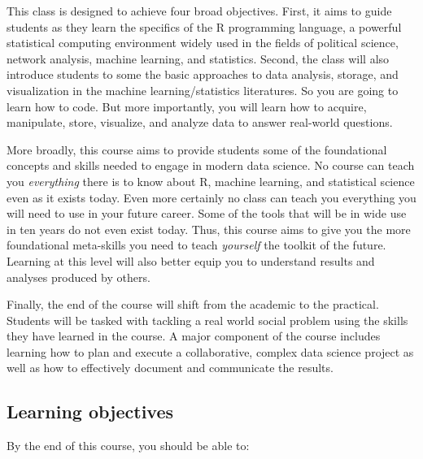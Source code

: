 \documentclass[11pt]{article}
\begin{document}
This class is designed to achieve four broad objectives. First, it
aims to guide students as they learn the specifics of the R
programming language, a powerful statistical computing environment
widely used in the fields of political science, network analysis,
machine learning, and statistics.  Second, the class will also
introduce students to some the basic approaches to data analysis,
storage, and visualization in the machine learning/statistics
literatures.  So you are going to learn how to code. But more
importantly, you will learn how to acquire, manipulate, store,
visualize, and analyze data to answer real-world questions.

More broadly, this course aims to provide students some of
the foundational concepts and skills needed to engage in modern data
science.  No course can teach you \textit{everything} there
is to know about R, machine learning, and statistical science even as
it exists today.  Even more certainly no class can teach you everything you will need to use in your future career.  Some of the
tools that will be in wide use in ten years do not even exist today.
Thus, this course aims to give you the more foundational meta-skills
you need to teach \textit{yourself} the toolkit of the future.  Learning at this level will also better
equip you to understand results and analyses produced by others.

Finally, the end of the course will shift from the academic to the
practical.  Students will be tasked
with tackling a real world social problem using the skills they
have learned in the course. A major component of the course includes
learning how to plan and execute a collaborative, complex data science
project as well as how to effectively document and communicate the results.
 
\newpage

\subsection*{Learning objectives}

By the end of this course, you should be able to:
\end{document}
